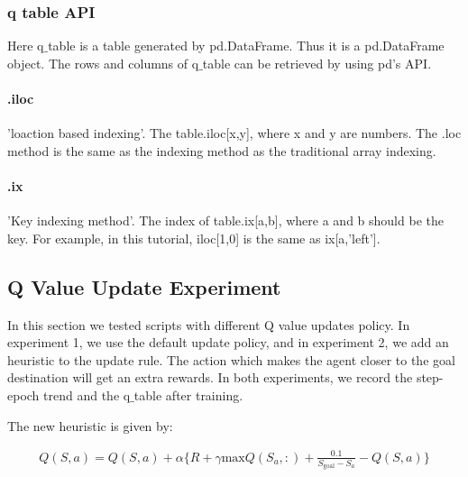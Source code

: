 \documentclass{article}
\begin{document}
\subsubsection{q table API}
Here q$\_$table is a table generated by pd.DataFrame. Thus it is a pd.DataFrame object. The rows and columns of q$\_$table can be retrieved by using pd's API.
\paragraph{.iloc}
'loaction based indexing'. The table.iloc[x,y], where x and y are numbers. The .loc method is the same as the indexing method as the traditional array indexing.
\paragraph{.ix}
'Key indexing method'. The index of table.ix[a,b], where a and b should be the key. For example, in this tutorial, iloc[1,0] is the same as ix[a,'left'].
\subsection{Q Value Update Experiment}
In this section we tested scripts with different Q value updates policy. In experiment 1, we use the default update policy, and in experiment 2, we add an heuristic to the update rule. The action which makes the agent closer to the goal destination will get an extra rewards. In both experiments, we record the step-epoch trend and the q$\_$table after training. 

The new heuristic is given by:

\begin{align*}
Q(S,a) = Q(S,a) + \alpha \{R + \gamma \text{max} Q(S_a, :)+\frac{0.1}{S_{\text{goal}}-S_a}-Q(S,a)\}
\end{align*}
\end{document}
